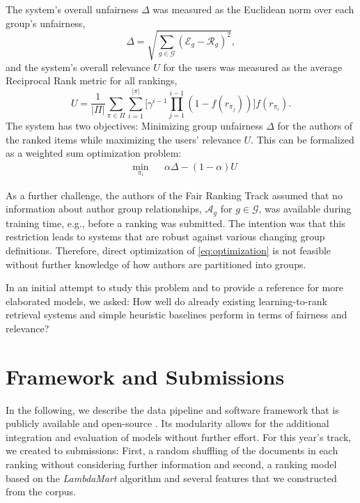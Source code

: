 \documentclass[sigconf, nonacm]{acmart}
\begin{document}
The system's overall unfairness $\Delta$ was measured as the Euclidean norm over each group's unfairness,
\begin{equation}
    \Delta = \sqrt{\sum_{g \in \mathcal{G}} (\mathcal{E}_g - \mathcal{R}_g)^2},
\end{equation}
and the system's overall relevance $U$ for the users was measured as the average Reciprocal Rank metric for all rankings, 
\begin{equation}
    U = \frac{1}{|\Pi|}\sum_{\pi \in \Pi} \sum_{i=1}^{|\pi|} \Big[\gamma^{i-1} \prod_{j=1}^{i-1}(1-f(r_{\pi_j}))\Big]f(r_{\pi_i}).
\end{equation}
The system has two objectives: Minimizing group unfairness $\Delta$ for the authors of the ranked items while maximizing the users' relevance $U$. This can be formalized as a weighted sum optimization problem:
\begin{equation}
\begin{aligned}
& \underset{\pi_i}{\text{min}}
& & \alpha \Delta - (1-\alpha)U
\end{aligned}
\label{eq:optimization}
\end{equation}

As a further challenge, the authors of the Fair Ranking Track assumed that no information about author group relationships, $\mathcal{A}_g$ for $g \in \mathcal{G}$, was available during training time, e.g., before a ranking was submitted. The intention was that this restriction leads to systems that are robust against various changing group definitions. Therefore, direct optimization of \eqref{eq:optimization} is not feasible without further knowledge of how authors are partitioned into groups. 

In an initial attempt to study this problem and to provide a reference for more elaborated models, we asked: How well do already existing learning-to-rank retrieval systems and simple heuristic baselines perform in terms of fairness and relevance? 

\section{Framework and Submissions}

In the following, we describe the data pipeline and software framework that is publicly available and open-source \cite{malte_bonart_2019_3514668}. Its modularity allows for the additional integration and evaluation of models without further effort. For this year's track, we created to submissions: First, a random shuffling of the documents in each ranking without considering further information and second, a ranking model based on the \emph{LambdaMart} \cite{burges_ranknet_2010, ma_jma127/pyltr_2019} algorithm and several features that we constructed from the corpus.
\end{document}
